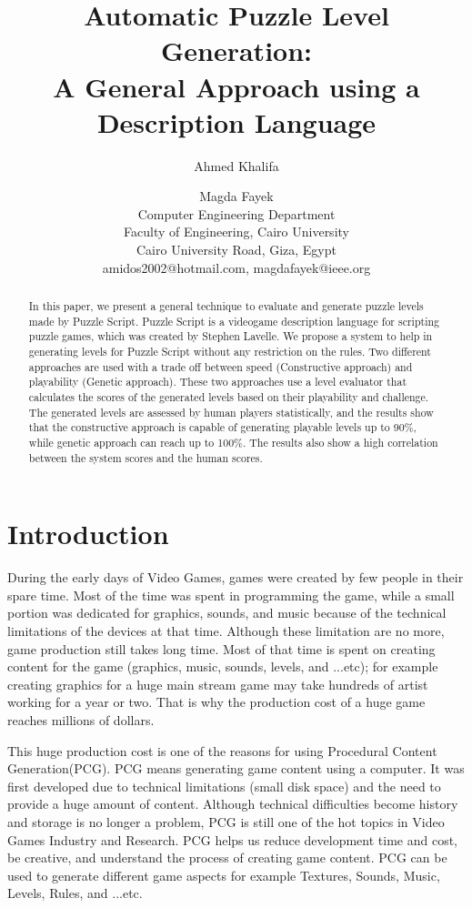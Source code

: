 \documentclass[letterpaper]{article}
\title{Automatic Puzzle Level Generation:\\
A General Approach using a Description Language}
\author{Ahmed Khalifa \and Magda Fayek\\
Computer Engineering Department\\
Faculty of Engineering, Cairo University\\
Cairo University Road, Giza, Egypt\\
amidos2002@hotmail.com, magdafayek@ieee.org\\
}
\begin{document}
 
\maketitle
\begin{abstract}
In this paper, we present a general technique to evaluate and generate puzzle levels made by Puzzle Script. Puzzle Script is a videogame description language for scripting puzzle games, which was created by Stephen Lavelle\cite{puzzleScript}. We propose a system to help in generating levels for Puzzle Script without any restriction on the rules. Two different approaches are used with a trade off between speed (Constructive approach) and playability (Genetic approach). These two approaches use a level evaluator that calculates the scores of the generated levels based on their playability and challenge. The generated levels are assessed by human players statistically, and the results show that the constructive approach is capable of generating playable levels up to 90\%, while genetic approach can reach up to 100\%. The results also show a high correlation between the system scores and the human scores.
\end{abstract}

\section{Introduction}
During the early days of Video Games, games were created by few people in their spare time. Most of the time was spent in programming the game, while a small portion was dedicated for graphics, sounds, and music because of the technical limitations of the devices at that time. Although these limitation are no more, game production still takes long time. Most of that time is spent on creating content for the game (graphics, music, sounds, levels, and ...etc)\cite{budgetAAA}; for example creating graphics for a huge main stream game may take hundreds of artist working for a year or two. That is why the production cost of a huge game reaches millions of dollars\cite{gameCost}.\\\par

This huge production cost is one of the reasons for using Procedural Content Generation(PCG). PCG means generating game content using a computer. It was first developed due to technical limitations (small disk space) and the need to provide a huge amount of content\cite{pcgFirstGame}. Although technical difficulties become history and storage is no longer a problem, PCG is still one of the hot topics in Video Games Industry and Research. PCG helps us reduce development time and cost, be creative, and understand the process of creating game content. PCG can be used to generate different game aspects for example Textures, Sounds, Music, Levels, Rules, and ...etc.\\\par
\end{document}
